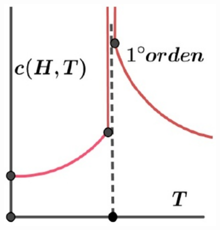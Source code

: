 \begin{figure}[H]
\begin{minipage}[b]{0.30\textwidth}
	\label{fig:430}
  \end{minipage}
  \hfill  
  \begin{minipage}[b]{0.30\textwidth}
    \includegraphics[width=1.0\textwidth]{./Figures/fig431}
	\label{fig:431}
  \end{minipage}  
\end{figure}



